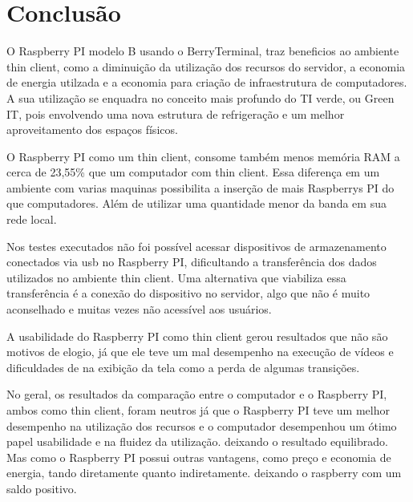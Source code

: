 \documentclass[
	12pt,				%
	openright,			%
	twoside,			%
	a4paper,			%
	chapter=TITLE,		%
	english,			%
	brazil				%
	]{abntex2}
\begin{document}




\chapter{Conclusão}

O Raspberry PI modelo B usando o BerryTerminal, traz beneficios ao ambiente thin client, como a diminuição da utilização dos recursos do servidor, a economia de energia utilzada e a economia para criação de infraestrutura de computadores. A sua utilização se enquadra no conceito mais profundo do TI verde, ou Green IT, pois envolvendo uma nova estrutura de refrigeração e um melhor aproveitamento dos espaços físicos. 

O Raspberry PI como um thin client, consome também menos memória RAM a cerca de 23,55\% que um computador com thin client. Essa diferença em um ambiente com varias maquinas possibilita a inserção de mais Raspberrys PI do que computadores. Além de utilizar uma quantidade menor da banda em sua rede local.

Nos testes executados não foi possível acessar dispositivos de armazenamento conectados via usb no Raspberry PI, dificultando a transferência dos dados utilizados no ambiente thin client. Uma alternativa que viabiliza essa transferência é a conexão do dispositivo no servidor, algo que não é muito aconselhado e muitas vezes não acessível aos usuários.

A usabilidade do Raspberry PI como thin client gerou resultados que não são motivos de elogio, já que ele teve um mal desempenho na execução de vídeos e dificuldades de na exibição da tela como a perda de algumas transições.

No geral, os resultados da comparação entre o computador e o Raspberry PI, ambos como thin client, foram neutros já que o Raspberry PI teve um melhor desempenho na utilização dos recursos e o computador desempenhou um ótimo papel usabilidade e na fluidez da utilização. deixando o resultado equilibrado. Mas como o Raspberry PI possui outras vantagens, como preço e economia de energia, tando diretamente quanto indiretamente. deixando o raspberry com um saldo positivo.
\end{document}
